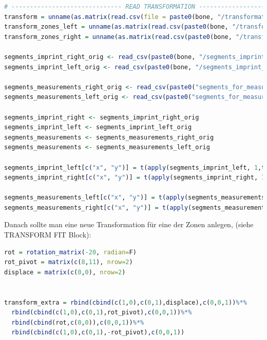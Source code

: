 \documentclass[a4paper, openany, oneside]{memoir}
\begin{document}
\begin{minipage}[c]{\textwidth}
\begin{lstlisting}[language=R]
# ------------------------------ READ TRANSFORMATION ----------------------------------------
transform = unname(as.matrix(read.csv(file = paste0(bone, "/transformation_r_imprint_",ground_type, ".csv"), header=F)))
transform_zones_left = unname(as.matrix(read.csv(paste0(bone, "/transformation_r_zones_left_",ground_type, ".csv"), header = F)))
transform_zones_right = unname(as.matrix(read.csv(paste0(bone, "/transformation_r_zones_right_",ground_type, ".csv"), header = F)))

segments_imprint_right_orig <- read_csv(paste0(bone, "/segments_imprint_right", ".csv"))
segments_imprint_left_orig <- read_csv(paste0(bone, "/segments_imprint_left", ".csv"))

segments_measurements_right_orig <- read_csv(paste0("segments_for_measurements_right", ".csv"))
segments_measurements_left_orig <- read_csv(paste0("segments_for_measurements_left", ".csv"))

segments_imprint_right <- segments_imprint_right_orig
segments_imprint_left <- segments_imprint_left_orig
segments_measurements <- segments_measurements_right_orig 
segments_measurements <- segments_measurements_left_orig

segments_imprint_left[c("x", "y")] = t(apply(segments_imprint_left, 1,trans_func, mat = transform))
segments_imprint_right[c("x", "y")] = t(apply(segments_imprint_right, 1, trans_func, mat = transform))

segments_measurements_left[c("x", "y")] = t(apply(segments_measurements_left_orig, 1, trans_func, mat = transform_zones_left))
segments_measurements_right[c("x", "y")] = t(apply(segments_measurements_right_orig, 1, trans_func, mat = transform_zones_right))
\end{lstlisting}
\end{minipage}

Danach sollte man eine neue Transformation für eine der Zonen anlegen, (siehe TRANSFORM FIT Block):

\begin{minipage}[c]{\textwidth}
\begin{lstlisting}[language=R, label = code:transform, caption={Definition einer neuen Transformation}]
rot = rotation_matrix(-20, radian=F)
rot_pivot = matrix(c(8,11), nrow=2)
displace = matrix(c(0,0), nrow=2)


transform_extra = rbind(cbind(c(1,0),c(0,1),displace),c(0,0,1))%*%
  rbind(cbind(c(1,0),c(0,1),rot_pivot),c(0,0,1))%*%
  rbind(cbind(rot,c(0,0)),c(0,0,1))%*%
  rbind(cbind(c(1,0),c(0,1),-rot_pivot),c(0,0,1))
\end{lstlisting}
\end{minipage}
\end{document}
